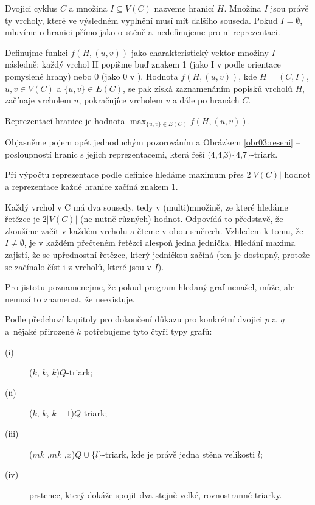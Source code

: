 \begin{definice}\label{def01:1}
Dvojici cyklus $C$ a množina $I \subseteq V(C)$ nazveme hranicí $H$. Množina $I$ jsou právě ty vrcholy, které ve výsledném vyplnění musí mít dalšího souseda. Pokud  $I = \emptyset$, mluvíme o hranici přímo jako o~stěně a~nedefinujeme pro ni reprezentaci.

Definujme funkci $f(H,(u,v))$ jako charakteristický vektor množiny $I$ následně: každý vrchol H popišme buď znakem 1 (jako I v  podle orientace pomyslené hrany) nebo 0 (jako 0 v ). Hodnota $f(H, (u, v))$, kde $H=(C, I)$, $u, v \in V(C)$ a $ \lbrace u, v \rbrace \in E(C)$, se pak získá zaznamenáním popisků vrcholů $H$, začínaje vrcholem $u$, pokračujíce vrcholem $v$ a dále po hranách $C$. 

Reprezentací hranice je hodnota $\max_{\lbrace u, v \rbrace \in E(C)} {f(H,(u,v))}$.
\end{definice}

Objasněme pojem opět jednoduchým pozorováním a Obrázkem \ref{obr03:reseni} -- posloupností hranic s jejich reprezentacemi, která řeší (4,4,3)$\lbrace$4,7$\rbrace$-triark. 


\begin{tvrz}
Při výpočtu reprezentace podle definice hledáme maximum přes $2 |V(C)|$ hodnot a reprezentace každé hranice začíná znakem 1.
\end{tvrz}

\begin{dukaz}
Každý vrchol v C má dva sousedy, tedy v (multi)množině, ze které hledáme řetězce je $2 |V(C)|$ (ne nutně různých) hodnot. Odpovídá to představě, že zkoušíme začít v každém vrcholu a čteme v obou směrech. Vzhledem k tomu, že $I\neq \emptyset$, je v každém přečteném řetězci alespoň jedna jednička. Hledání maxima zajistí, že se upřednostní řetězec, který jedničkou začíná (ten je dostupný, protože se začínalo číst i z vrcholů, které jsou v $I$).  
\end{dukaz}

Pro jistotu poznamenejme, že pokud program hledaný graf nenašel, může, ale nemusí to znamenat, že neexistuje.


\bigskip

Podle předchozí kapitoly pro dokončení důkazu pro konkrétní dvojici $p$ a~$q$ a~nějaké přirozené $k$ potřebujeme tyto čtyři typy grafů:
\begin{description}
\item[(i)] ($k$, $k$, $k$)$Q$-triark;
\item[(ii)] ($k$, $k$, $k-1$)$Q$-triark;
\item[(iii)] ($mk$ ,$mk$ ,$x$)$Q\cup \lbrace l\rbrace$-triark, kde je právě jedna stěna velikosti $l$;
\item[(iv)] prstenec, který dokáže spojit dva stejně velké, rovnostranné triarky.
\end{description}

